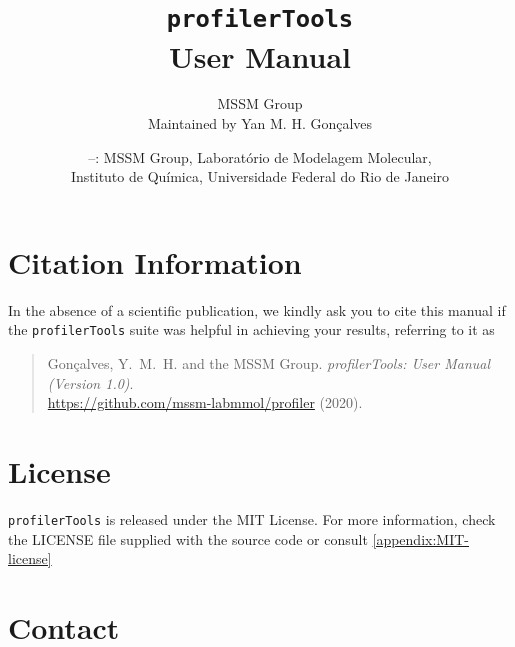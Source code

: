 \documentclass[10pt,a4paper,openany]{memoir}
\title{\Huge\texttt{profilerTools} \\ User Manual}
\author{{\huge MSSM Group} \\ Maintained by Yan M. H. Gonçalves}
\date{\footnotesize\textcopyright 2020--: \hspace{5ex}
  MSSM Group, Laboratório de Modelagem Molecular,\\
  \hspace{16ex} Instituto de Química, Universidade Federal do Rio de Janeiro}
\numberwithin{equation}{section}
\newcommand{\profilertools}[0]{\texttt{profilerTools}}
\begin{document}
  \maketitle
  \thispagestyle{empty}

  \clearpage
  \frontmatter
  \nouppercaseheads
  \addtolength{\headheight}{2ex}
  \addtolength{\headsep}{-2ex}

  \section{Citation Information}





  In the absence of a scientific publication, we kindly ask you to
  cite this manual if the \profilertools{} suite was helpful in
  achieving your results, referring to it as

  \begin{quote}
    Gonçalves, Y.~M.~H. and the MSSM Group. \textit{profilerTools: User Manual
      (Version 1.0)}.\\
    \url{https://github.com/mssm-labmmol/profiler}
    (2020).
  \end{quote}

  \section{License}

  \profilertools{} is released under the MIT License. For more
  information, check the LICENSE file supplied with the source code or
  consult \autoref{appendix:MIT-license}

  \section{Contact}
\end{document}
